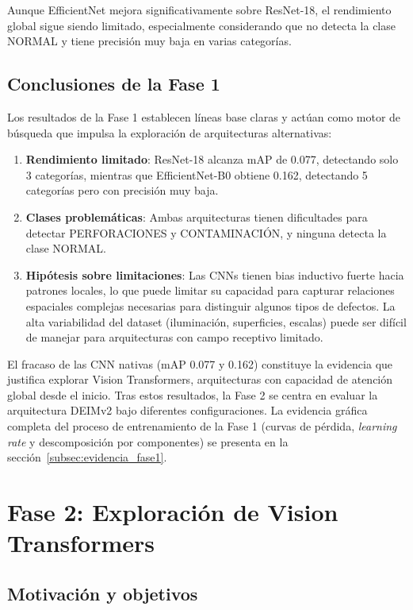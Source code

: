 Aunque EfficientNet mejora significativamente sobre ResNet-18, el rendimiento global sigue siendo limitado, especialmente considerando que no detecta la clase NORMAL y tiene precisión muy baja en varias categorías.

\subsection{Conclusiones de la Fase 1}

Los resultados de la Fase 1 establecen líneas base claras y actúan como motor de búsqueda que impulsa la exploración de arquitecturas alternativas:

\begin{enumerate}
    \item \textbf{Rendimiento limitado}: ResNet-18 alcanza mAP de 0.077, detectando solo 3 categorías, mientras que EfficientNet-B0 obtiene 0.162, detectando 5 categorías pero con precisión muy baja.
    \item \textbf{Clases problemáticas}: Ambas arquitecturas tienen dificultades para detectar PERFORACIONES y CONTAMINACIÓN, y ninguna detecta la clase NORMAL.
    \item \textbf{Hipótesis sobre limitaciones}: Las CNNs tienen bias inductivo fuerte hacia patrones locales, lo que puede limitar su capacidad para capturar relaciones espaciales complejas necesarias para distinguir algunos tipos de defectos. La alta variabilidad del dataset (iluminación, superficies, escalas) puede ser difícil de manejar para arquitecturas con campo receptivo limitado.
\end{enumerate}

El fracaso de las CNN nativas (mAP 0.077 y 0.162) constituye la evidencia que justifica explorar Vision Transformers, arquitecturas con capacidad de atención global desde el inicio. Tras estos resultados, la Fase 2 se centra en evaluar la arquitectura DEIMv2 bajo diferentes configuraciones. La evidencia gráfica completa del proceso de entrenamiento de la Fase 1 (curvas de pérdida, \textit{learning rate} y descomposición por componentes) se presenta en la sección~\ref{subsec:evidencia_fase1}.


\section{Fase 2: Exploración de Vision Transformers}
\label{sec:fase2}

\subsection{Motivación y objetivos}

